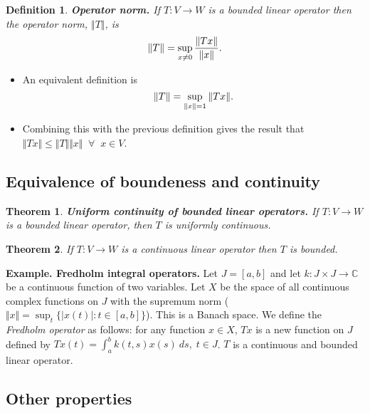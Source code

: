 \documentclass[two column]{article}
\newtheorem{theorem}{Theorem}[subsection]
\newtheorem{definition}{Definition}[subsection]
\begin{document}
\begin{definition} \label{operator norm}
{\bf Operator norm.} If $T : V \rightarrow W$ is a bounded linear operator then the operator norm, $\Vert T \Vert$, is \vspace{-7pt}
\[
\Vert T \Vert = \sup_{x \neq 0} \frac{\Vert Tx \Vert}{\Vert x \Vert}. \vspace{-8pt}
\]
\end{definition}
\begin{itemize}
\item An equivalent definition is \vspace{-5pt}
\[
\Vert T \Vert = \sup_{\Vert x \Vert = 1} \Vert Tx \Vert. \vspace{-5pt}
\]
\item Combining this with the previous definition gives the result that $\Vert Tx \Vert \leq \Vert T \Vert \Vert x \Vert \;\; \forall \;\; x \in V$. 
\end{itemize}

\subsection{Equivalence of boundeness and continuity}

\begin{theorem}
{\bf Uniform continuity of bounded linear operators.} If $T : V \rightarrow W$ is a bounded linear operator, then $T$ is uniformly continuous. \\
\end{theorem}

\begin{theorem}
If $T : V \rightarrow W$ is a continuous linear operator then $T$ is bounded. 
\end{theorem}

{\bf Example. Fredholm integral operators.} Let $J = [a,b]$ and let $k : J \times J \rightarrow \mathbb{C}$ be a continuous function of two variables. Let $X$ be the space of all continuous complex functions on $J$ with the supremum norm ($\Vert x \Vert = \sup_{t} \{ \vert x(t) \vert : t \in [a,b] \}$). This is a Banach space. We define the \emph{Fredholm operator} as follows: for any function $x \in X$, $Tx$ is a new function on $J$ defined by $Tx(t) = \int_{a}^{b} k(t,s)x(s) \: ds, \; t \in J$. $T$ is a continuous and bounded linear operator. 

\subsection{Other properties}
\end{document}

